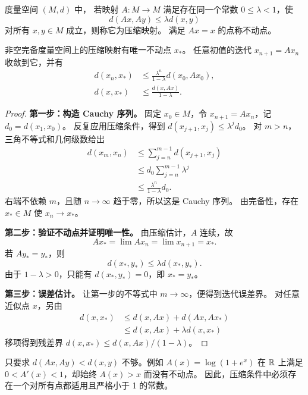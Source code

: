 \begin{definition}
度量空间 $(M,d)$ 中，
若映射 $A:M\to M$ 满足存在同一个常数 $0\leq\lambda<1$，使
\[
 d(Ax,Ay)\leq\lambda d(x,y)
\]
 对所有 $x,y\in M$ 成立，则称它为压缩映射。
满足 $Ax=x$ 的点称不动点。
\end{definition}
\begin{theorem}[压缩映射定理]\label{thm:arnold-banach}
非空完备度量空间上的压缩映射有唯一不动点 $x_*$。
任意初值的迭代 $x_{n+1}=Ax_n$ 收敛到它，并有
\[
 \begin{aligned}
 d(x_n,x_*)&\leq\frac{\lambda^n}{1-\lambda}d(x_0,Ax_0),\\
 d(x,x_*)&\leq\frac{d(x,Ax)}{1-\lambda}.
\end{aligned}
\]
\end{theorem}
\begin{proof}
\textbf{第一步：构造 Cauchy 序列。}
固定 $x_0\in M$，令 $x_{n+1}=Ax_n$，记 $d_0=d(x_1,x_0)$。
反复应用压缩条件，得到
$d(x_{j+1},x_j)\leq\lambda^jd_0$。
对 $m>n$，三角不等式和几何级数给出
\[
 \begin{aligned}
 d(x_m,x_n)&\leq\sum_{j=n}^{m-1}d(x_{j+1},x_j)\\
 &\leq d_0\sum_{j=n}^{m-1}\lambda^j\\
 &\leq\frac{\lambda^n}{1-\lambda}d_0.
\end{aligned}
\]
右端不依赖 $m$，且随 $n\to\infty$ 趋于零，所以这是 Cauchy 序列。
由完备性，存在 $x_*\in M$ 使 $x_n\to x_*$。

\textbf{第二步：验证不动点并证明唯一性。}
由压缩估计，$A$ 连续，故
\[
 Ax_*=\lim Ax_n=\lim x_{n+1}=x_*.
\]
若 $Ay_*=y_*$，则
\[
 d(x_*,y_*)\leq\lambda d(x_*,y_*).
\]
由于 $1-\lambda>0$，只能有 $d(x_*,y_*)=0$，即 $x_*=y_*$。

\textbf{第三步：误差估计。}
让第一步的不等式中 $m\to\infty$，便得到迭代误差界。
对任意近似点 $x$，另由
\[
 \begin{aligned}
 d(x,x_*)&\leq d(x,Ax)+d(Ax,Ax_*)\\
 &\leq d(x,Ax)+\lambda d(x,x_*)
\end{aligned}
\]
移项得到残差界 $d(x,x_*)\leq d(x,Ax)/(1-\lambda)$。
\end{proof}
只要求 $d(Ax,Ay)<d(x,y)$ 不够。例如
$A(x)=\log(1+e^x)$ 在 $\mathbb{R}$ 上满足 $0<A'(x)<1$，却始终 $A(x)>x$ 而没有不动点。
因此，压缩条件中必须存在一个对所有点都适用且严格小于 1 的常数。


